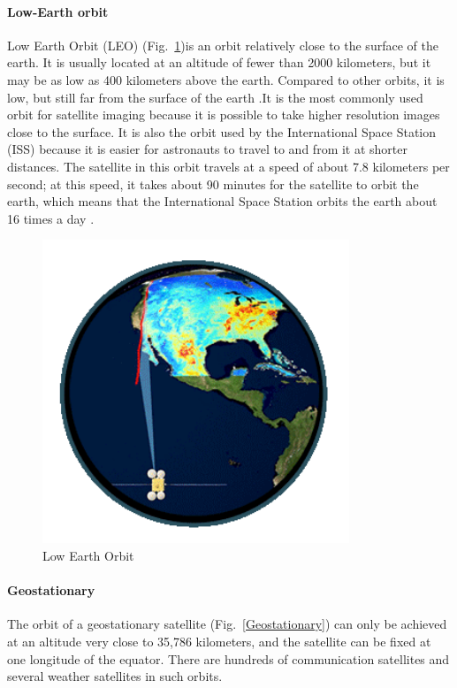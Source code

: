 \documentclass[conference]{IEEEtran}
\begin{document}
\paragraph{Low-Earth orbit}

Low Earth Orbit (LEO) (Fig.~\ref{LEO})is an orbit relatively close to the surface of the earth. It is usually located at an altitude of fewer than 
2000 kilometers, but it may be as low as 400 kilometers above the earth. Compared to other orbits, it is low, but still far from the 
surface of the earth \cite{earthdata28:online}.It is the most commonly used orbit for satellite imaging because it is possible to take 
higher resolution images close to the surface. It is also the orbit used by the International Space Station (ISS) because it is easier 
for astronauts to travel to and from it at shorter distances. The satellite in this orbit travels at a speed of about 7.8 kilometers per 
second; at this speed, it takes about 90 minutes for the satellite to orbit the earth, which means that the International Space Station 
orbits the earth about 16 times a day \cite{ESAkerne12:online}.

\begin{figure}[htbp]
    \centerline{\includegraphics[width=260pt]{images/1.1.2.png}}
    \caption{Low Earth Orbit}
    \label{LEO}
\end{figure}


\paragraph{Geostationary}
    
The orbit of a geostationary satellite (Fig.~\ref{Geostationary}) can only be achieved at an altitude very close to 35,786 kilometers, and the satellite can 
be fixed at one longitude of the equator. There are hundreds of communication satellites and several weather satellites in such orbits.
\end{document}
